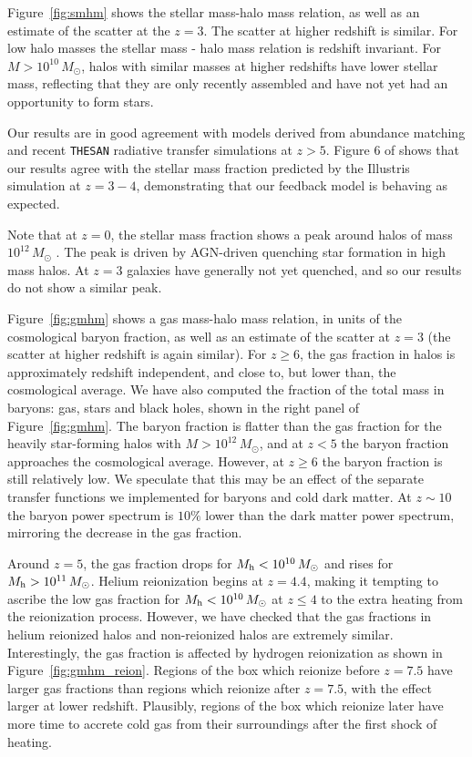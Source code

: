 \documentclass[fleqn,usenatbib]{mnras}
\def\msun{\, M_{\odot}}
\begin{document}
Figure~\ref{fig:smhm} shows the stellar mass-halo mass relation, as well as an estimate of the scatter at the $z=3$. The scatter at higher redshift is similar. For low halo masses the stellar mass - halo mass relation is redshift invariant. For $M > 10^{10} \msun$, halos with similar masses at higher redshifts have lower stellar mass, reflecting that they are only recently assembled and have not yet had an opportunity to form stars.

Our results are in good agreement with models derived from abundance matching \citep{2019MNRAS.488.3143B} and recent \texttt{THESAN} radiative transfer simulations \citep{2021arXiv211000584K} at $z > 5$. Figure 6 of \cite{2014MNRAS.445..175G} shows that our results agree with the stellar mass fraction predicted by the Illustris simulation at $z = 3-4$, demonstrating that our feedback model is behaving as expected.

Note that at $z=0$, the stellar mass fraction shows a peak around halos of mass $10^{12} \msun$ \cite[e.g.][Figure 11]{2018MNRAS.475..648P}. The peak is driven by AGN-driven quenching star formation in high mass halos. At $z=3$ galaxies have generally not yet quenched, and so our results do not show a similar peak.

Figure~\ref{fig:gmhm} shows a gas mass-halo mass relation, in units of the cosmological baryon fraction, as well as an estimate of the scatter at $z=3$ (the scatter at higher redshift is again similar). For $z \geq 6$, the gas fraction in halos is approximately redshift independent, and close to, but lower than, the cosmological average. We have also computed the fraction of the total mass in baryons: gas, stars and black holes, shown in the right panel of Figure~\ref{fig:gmhm}. The baryon fraction is flatter than the gas fraction for the heavily star-forming halos with $M> 10^{12}\msun$, and at $z < 5$ the baryon fraction approaches the cosmological average. However, at $z \geq 6$ the baryon fraction is still relatively low. We speculate that this may be an effect of the separate transfer functions we implemented for baryons and cold dark matter. At $z \sim 10$ the baryon power spectrum is $10\%$ lower than the dark matter power spectrum, mirroring the decrease in the gas fraction.

Around $z=5$, the gas fraction drops for $M_{\rm h} < 10^{10} \msun$ and rises for $M_{\rm h} > 10^{11} \msun$. Helium reionization begins at $z=4.4$, making it tempting to ascribe the low gas fraction for $M_{\rm h} < 10^{10} \msun$ at $z \leq 4$ to the extra heating from the reionization process. However, we have checked that the gas fractions in helium reionized halos and non-reionized halos are extremely similar. Interestingly, the gas fraction is affected by hydrogen reionization as shown in Figure~\ref{fig:gmhm_reion}. Regions of the box which reionize before $z = 7.5$ have larger gas fractions than regions which reionize after $z=7.5$, with the effect larger at lower redshift. Plausibly, regions of the box which reionize later have more time to accrete cold gas from their surroundings after the first shock of heating.
\end{document}
